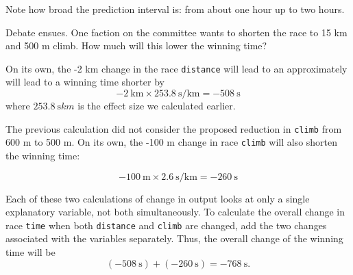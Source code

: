 \documentclass[
  letterpaper,
  DIV=11,
  numbers=noendperiod,
  oneside]{scrartcl}
\begin{document}
Note how broad the prediction interval is: from about one hour up to two
hours.

Debate ensues. One faction on the committee wants to shorten the race to
15 km and 500 m climb. How much will this lower the winning time?

On its own, the -2 km change in the race \texttt{distance} will lead to
an approximately will lead to a winning time shorter by
\[-2\ \text{km} \times 253.8\ \text{s/km} = -508\ \text{s}\] where
\(253.8\ \text{s}{km}\) is the effect size we calculated earlier.

The previous calculation did not consider the proposed reduction in
\texttt{climb} from 600 m to 500 m. On its own, the -100 m change in
race \texttt{climb} will also shorten the winning time:

\[ -100\ \text{m} \times 2.6\ \text{s/km} = -260\ \text{s}\]

Each of these two calculations of change in output looks at only a
single explanatory variable, not both simultaneously. To calculate the
overall change in race \texttt{time} when both \texttt{distance} and
\texttt{climb} are changed, add the two changes associated with the
variables separately. Thus, the overall change of the winning time will
be \[(-508\ \text{s}) + (-260\ \text{s}) = -768\ \text{s} .\]
\end{document}
